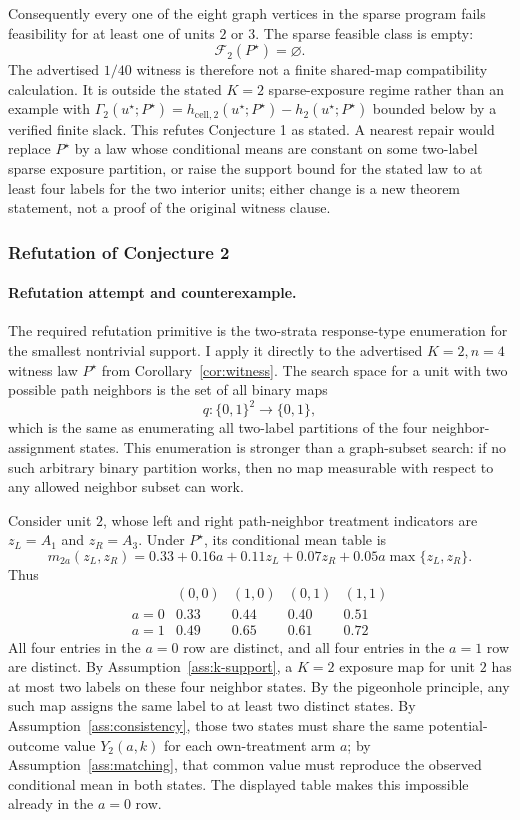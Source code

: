 \documentclass[11pt]{article}
\theoremstyle{definition}
\theoremstyle{plain}
\theoremstyle{remark}
\begin{document}
Consequently every one of the eight graph vertices in the sparse program fails feasibility for at least one of units \(2\) or \(3\).  The sparse feasible class is empty:
\[
\mathcal F_2(P^\star)=\varnothing.
\]
The advertised \(1/40\) witness is therefore not a finite shared-map compatibility calculation.  It is outside the stated \(K=2\) sparse-exposure regime rather than an example with
\(\Gamma_2(u^\star;P^\star)=h_{\mathrm{cell},2}(u^\star;P^\star)-h_2(u^\star;P^\star)\) bounded below by a verified finite slack.  This refutes Conjecture 1 as stated.  A nearest repair would replace \(P^\star\) by a law whose conditional means are constant on some two-label sparse exposure partition, or raise the support bound for the stated law to at least four labels for the two interior units; either change is a new theorem statement, not a proof of the original witness clause.

\subsubsection*{Refutation of Conjecture 2}
\paragraph{Refutation attempt and counterexample.}
The required refutation primitive is the two-strata response-type enumeration for the smallest nontrivial support.  I apply it directly to the advertised \(K=2,n=4\) witness law \(P^\star\) from Corollary~\ref{cor:witness}.  The search space for a unit with two possible path neighbors is the set of all binary maps
\[
q:\{0,1\}^2\to\{0,1\},
\]
which is the same as enumerating all two-label partitions of the four neighbor-assignment states.  This enumeration is stronger than a graph-subset search: if no such arbitrary binary partition works, then no map measurable with respect to any allowed neighbor subset can work.

Consider unit \(2\), whose left and right path-neighbor treatment indicators are \(z_L=A_1\) and \(z_R=A_3\).  Under \(P^\star\), its conditional mean table is
\[
m_{2a}(z_L,z_R)
=0.33+0.16a+0.11z_L+0.07z_R+0.05a\max\{z_L,z_R\}.
\]
Thus
\[
\begin{array}{c|cccc}
& (0,0)&(1,0)&(0,1)&(1,1)\\ \hline
a=0&0.33&0.44&0.40&0.51\\
a=1&0.49&0.65&0.61&0.72
\end{array}
\]
All four entries in the \(a=0\) row are distinct, and all four entries in the \(a=1\) row are distinct.  By Assumption~\ref{ass:k-support}, a \(K=2\) exposure map for unit \(2\) has at most two labels on these four neighbor states.  By the pigeonhole principle, any such map assigns the same label to at least two distinct states.  By Assumption~\ref{ass:consistency}, those two states must share the same potential-outcome value \(Y_2(a,k)\) for each own-treatment arm \(a\); by Assumption~\ref{ass:matching}, that common value must reproduce the observed conditional mean in both states.  The displayed table makes this impossible already in the \(a=0\) row.
\end{document}
